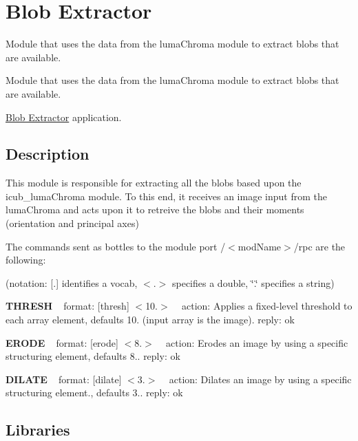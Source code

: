 \section{Blob Extractor}
\label{group__icub__blobExtractor}


Module that uses the data from the luma\+Chroma module to extract blobs that are available.  


Module that uses the data from the luma\+Chroma module to extract blobs that are available. 

\hyperlink{group__icub__blobExtractor}{Blob Extractor} application.\hypertarget{group__lbpExtract_intro_sec}{}\subsection{Description}\label{group__lbpExtract_intro_sec}
This module is responsible for extracting all the blobs based upon the icub\+\_\+luma\+Chroma module. To this end, it receives an image input from the luma\+Chroma and acts upon it to retreive the blobs and their moments (orientation and principal axes)

The commands sent as bottles to the module port /$<$mod\+Name$>$/rpc are the following\+:

(notation\+: \mbox{[}.\mbox{]} identifies a vocab, $<$.$>$ specifies a double, \char`\"{}.\char`\"{} specifies a string)

{\bfseries T\+H\+R\+E\+SH} ~\newline
format\+: \mbox{[}thresh\mbox{]} $<$10.$>$ ~\newline
action\+: Applies a fixed-\/level threshold to each array element, defaults 10. (input array is the image). reply\+: ok

{\bfseries E\+R\+O\+DE} ~\newline
format\+: \mbox{[}erode\mbox{]} $<$8.$>$ ~\newline
action\+: Erodes an image by using a specific structuring element, defaults 8.. reply\+: ok

{\bfseries D\+I\+L\+A\+TE} ~\newline
format\+: \mbox{[}dilate\mbox{]} $<$3.$>$ ~\newline
action\+: Dilates an image by using a specific structuring element., defaults 3.. reply\+: ok\hypertarget{group__icub__blobExtractor_lib_sec}{}\subsection{Libraries}\label{group__icub__blobExtractor_lib_sec}

